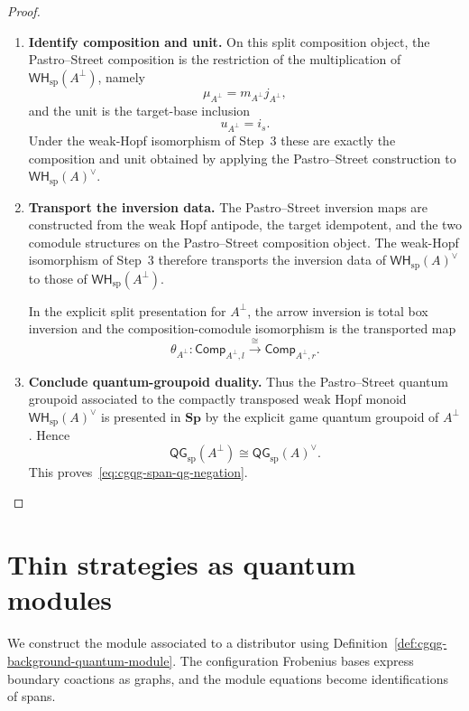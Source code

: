 \documentclass[oneside]{article}
\newcommand{\WH}{\mathsf{WH}}
\newcommand{\QG}{\mathsf{QG}}
\newcommand{\Sp}{\mathbf{Sp}}
\theoremstyle{plain}
\theoremstyle{definition}
\theoremstyle{remark}
\begin{document}
\begin{proof}
\begin{enumerate}[beginpenalty=10000]
        \item \textbf{Identify composition and unit.}
        On this split composition object, the Pastro--Street composition
        is the restriction of the multiplication of
        \(\WH_{\mathrm{sp}}(A^\perp)\), namely
        \[
            \mu_{A^\perp}
            =
            m_{A^\perp}j_{A^\perp},
        \]
        and the unit is the target-base inclusion
        \[
            u_{A^\perp}
            =
            i_s.
        \]
        Under the weak-Hopf isomorphism of Step~3 these are exactly the
        composition and unit obtained by applying the Pastro--Street
        construction to \(\WH_{\mathrm{sp}}(A)^\vee\).

        \item \textbf{Transport the inversion data.}
        The Pastro--Street inversion maps are constructed from the weak
        Hopf antipode, the target idempotent, and the two comodule
        structures on the Pastro--Street composition object. The
        weak-Hopf isomorphism of Step~3 therefore transports the
        inversion data of \(\WH_{\mathrm{sp}}(A)^\vee\) to those of
        \(\WH_{\mathrm{sp}}(A^\perp)\).

        In the explicit split presentation for \(A^\perp\), the arrow
        inversion is total box inversion and the composition-comodule
        isomorphism is the transported map
        \[
            \theta_{A^\perp}:
            \mathsf{Comp}_{A^\perp,l}
            \xrightarrow{\cong}
            \mathsf{Comp}_{A^\perp,r}.
        \]

        \item \textbf{Conclude quantum-groupoid duality.}
        Thus the Pastro--Street quantum groupoid associated to the
        compactly transposed weak Hopf monoid
        \(\WH_{\mathrm{sp}}(A)^\vee\) is presented in \(\Sp\) by the
        explicit game quantum groupoid of \(A^\perp\). Hence
        \[
            \QG_{\mathrm{sp}}(A^\perp)
            \cong
            \QG_{\mathrm{sp}}(A)^\vee.
        \]
        This proves~\eqref{eq:cgqg-span-qg-negation}. \qedhere
    \end{enumerate}
\end{proof}

\section{Thin strategies as quantum modules}
\label{sec:cgqg-strategy-quantum-modules}

We construct the module associated to a distributor using
Definition~\ref{def:cgqg-background-quantum-module}. The configuration
Frobenius bases express boundary coactions as graphs, and the module
equations become identifications of spans.
\end{document}
